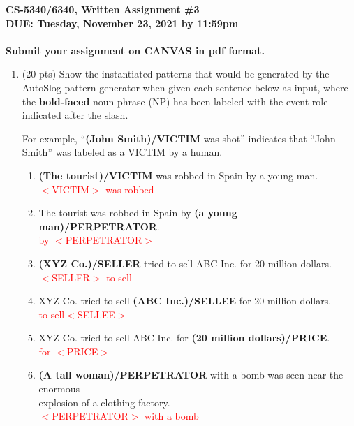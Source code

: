 \documentclass[11pt]{article}
\begin{document}
\large
\begin{center}
{\bf CS-5340/6340, Written Assignment \#3} \\
{\bf DUE: Tuesday, November 23, 2021 by 11:59pm} \\ ~ \\
{\bf  Submit your assignment on CANVAS in pdf format.}
\end{center}
\normalsize

\begin{enumerate}  


\item (20 pts) Show the instantiated patterns that would be
  generated by the AutoSlog pattern generator when given each sentence
  below as input, where the {\bf bold-faced} noun phrase (NP) has been
  labeled with the event role indicated after the slash. 

For example, ``{\bf (John Smith)/VICTIM} was shot'' indicates that
``John Smith'' was labeled as a VICTIM by a human.  \\

\begin{enumerate}

\item {\bf (The tourist)/VICTIM} was robbed in Spain by a young man. \\
\textcolor{red}{$<$VICTIM$>$ was robbed}


\item The tourist was robbed in Spain by {\bf (a young
    man)/PERPETRATOR}. \\
\textcolor{red}{by $<$PERPETRATOR$>$}


\item {\bf (XYZ Co.)/SELLER} tried to sell ABC Inc. for 20 million
  dollars. \\
\textcolor{red}{$<$SELLER$>$ to sell}

\item XYZ Co. tried to sell {\bf (ABC Inc.)/SELLEE} for 20 million dollars. \\
\textcolor{red}{to sell$<$SELLEE$>$}

\item XYZ Co. tried to sell ABC Inc. for {\bf (20 million
    dollars)/PRICE}. \\
\textcolor{red}{for $<$PRICE$>$}

\item {\bf (A tall woman)/PERPETRATOR} with a bomb was seen near the enormous
\\  explosion of a clothing factory. \\
\textcolor{red}{$<$PERPETRATOR$>$ with a bomb}


\end{enumerate}
\end{enumerate}
\end{document}
